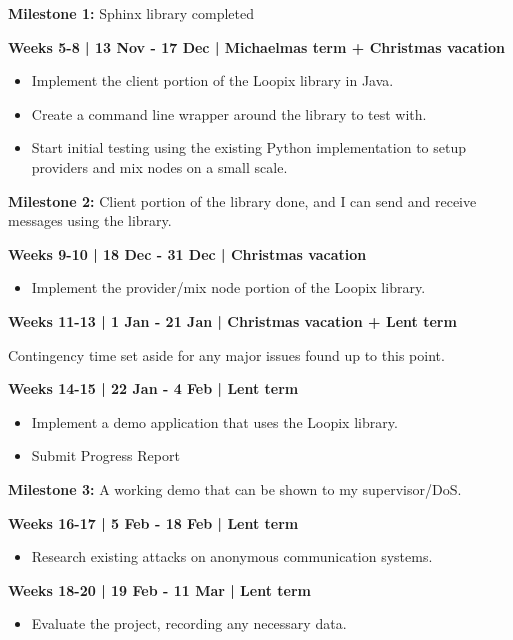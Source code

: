\documentclass[12pt,a4paper,twoside]{article}
\begin{document}
	\textbf{Milestone 1: }Sphinx library completed
	
	\textbf{Weeks 5-8 | 13 Nov - 17 Dec | Michaelmas term + Christmas vacation}
	
	\begin{itemize}
		\item Implement the client portion of the Loopix library in Java.
		\item Create a command line wrapper around the library to test with.
		\item Start initial testing using the existing Python implementation to setup providers and mix nodes on a small scale.
	\end{itemize}
	
	\textbf{Milestone 2:} Client portion of the library done, and I can send and receive messages using the library.
	
	\textbf{Weeks 9-10 | 18 Dec - 31 Dec | Christmas vacation}
	
	\begin{itemize}
		\item Implement the provider/mix node portion of the Loopix library.
	\end{itemize}
	
	\textbf{Weeks 11-13 | 1 Jan - 21 Jan | Christmas vacation + Lent term}
	
	Contingency time set aside for any major issues found up to this point.
	
	\textbf{Weeks 14-15 | 22 Jan - 4 Feb | Lent term}
	
	\begin{itemize}
		\item Implement a demo application that uses the Loopix library.
		\item Submit Progress Report
	\end{itemize}
	
	\textbf{Milestone 3:} A working demo that can be shown to my supervisor/DoS.
	
	\textbf{Weeks 16-17 | 5 Feb - 18 Feb | Lent term}
	
	\begin{itemize}
		\item Research existing attacks on anonymous communication systems.
	\end{itemize}
	
	\textbf{Weeks 18-20 | 19 Feb - 11 Mar | Lent term}
	
	\begin{itemize}
		\item Evaluate the project, recording any necessary data.
	\end{itemize}
	
\end{document}
